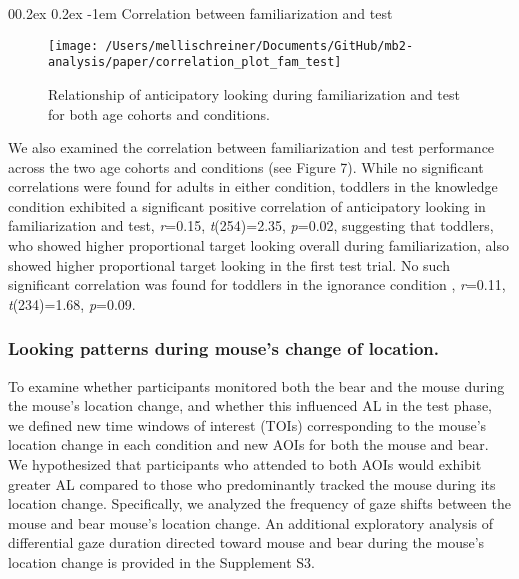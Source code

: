 \documentclass[
  man,floatsintext]{apa6}
\makeatletter
\let\oldparagraph\paragraph
\renewcommand{\paragraph}{
    \@ifstar
      \xxxParagraphStar
      \xxxParagraphNoStar
  }
\newcommand{\xxxParagraphStar}[1]{\oldparagraph*{#1}\mbox{}}
\newcommand{\xxxParagraphNoStar}[1]{\oldparagraph{#1}\mbox{}}
\renewcommand{\paragraph}{\@startsection{paragraph}{4}{\parindent}%
  {0\baselineskip \@plus 0.2ex \@minus 0.2ex}%
  {-1em}%
  {\normalfont\normalsize\bfseries\itshape\typesectitle}}
\makeatother
\begin{document}
\paragraph{Correlation between familiarization and test}\label{correlation-between-familiarization-and-test}

\begin{figure}

{\centering \texttt{[image: /Users/mellischreiner/Documents/GitHub/mb2-analysis/paper/correlation\_plot\_fam\_test]} 

}

\caption{Relationship of anticipatory looking during familiarization and test for both age cohorts and conditions.}\label{fig:fig7}
\end{figure}

We also examined the correlation between familiarization and test performance across the two age cohorts and conditions (see Figure 7). While no significant correlations were found for adults in either condition, toddlers in the knowledge condition exhibited a significant positive correlation of anticipatory looking in familiarization and test, \emph{r}=0.15, \emph{t}(254)=2.35, \emph{p}=0.02, suggesting that toddlers, who showed higher proportional target looking overall during familiarization, also showed higher proportional target looking in the first test trial. No such significant correlation was found for toddlers in the ignorance condition , \emph{r}=0.11, \emph{t}(234)=1.68, \emph{p}=0.09.

\subsubsection{Looking patterns during mouse's change of location.}\label{looking-patterns-during-mouses-change-of-location.}

To examine whether participants monitored both the bear and the mouse during the mouse's location change, and whether this influenced AL in the test phase, we defined new time windows of interest (TOIs) corresponding to the mouse's location change in each condition and new AOIs for both the mouse and bear. We hypothesized that participants who attended to both AOIs would exhibit greater AL compared to those who predominantly tracked the mouse during its location change. Specifically, we analyzed the frequency of gaze shifts between the mouse and bear mouse's location change. An additional exploratory analysis of differential gaze duration directed toward mouse and bear during the mouse's location change is provided in the Supplement S3.
\end{document}
